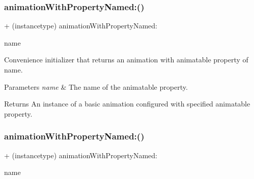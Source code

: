 \subsubsection{\texorpdfstring{animation\+With\+Property\+Named\+:()}{animationWithPropertyNamed:()}\hspace{0.1cm}{\footnotesize\ttfamily [2/3]}}
{\footnotesize\ttfamily + (instancetype) animation\+With\+Property\+Named\+: \begin{DoxyParamCaption}\item[{(N\+S\+String $\ast$)}]{name }\end{DoxyParamCaption}}

Convenience initializer that returns an animation with animatable property of name. 
\begin{DoxyParams}{Parameters}
{\em name} & The name of the animatable property. \\
\hline
\end{DoxyParams}
\begin{DoxyReturn}{Returns}
An instance of a basic animation configured with specified animatable property. 
\end{DoxyReturn}
\mbox{\label{interface_p_o_p_basic_animation_aa6332608f15c63f9ca6837fd595a2032}} 
\subsubsection{\texorpdfstring{animation\+With\+Property\+Named\+:()}{animationWithPropertyNamed:()}\hspace{0.1cm}{\footnotesize\ttfamily [3/3]}}
{\footnotesize\ttfamily + (instancetype) animation\+With\+Property\+Named\+: \begin{DoxyParamCaption}\item[{(N\+S\+String $\ast$)}]{name }\end{DoxyParamCaption}}

